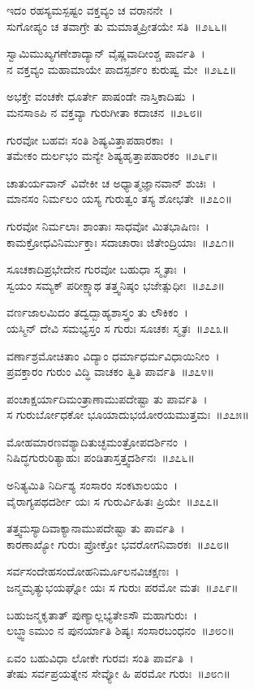 ಇದಂ ರಹಸ್ಯಮಸ್ಪಷ್ಟಂ ವಕ್ತವ್ಯಂ ಚ ವರಾನನೇ~।\\
ಸುಗೋಪ್ಯಂ ಚ ತವಾಗ್ರೇ ತು ಮಮಾತ್ಮಪ್ರೀತಯೇ ಸತಿ~॥೨೬೬॥

ಸ್ವಾಮಿಮುಖ್ಯಗಣೇಶಾದ್ಯಾನ್ ವೈಷ್ಣವಾದೀಂಶ್ಚ ಪಾರ್ವತಿ~।\\
ನ ವಕ್ತವ್ಯಂ ಮಹಾಮಾಯೇ ಪಾದಸ್ಪರ್ಶಂ ಕುರುಷ್ವ ಮೇ~॥೨೬೭॥

ಅಭಕ್ತೇ ವಂಚಕೇ ಧೂರ್ತೇ ಪಾಷಂಡೇ ನಾಸ್ತಿಕಾದಿಷು~।\\
ಮನಸಾಽಪಿ ನ ವಕ್ತವ್ಯಾ ಗುರುಗೀತಾ ಕದಾಚನ~॥೨೬೮॥

ಗುರವೋ ಬಹವಃ ಸಂತಿ ಶಿಷ್ಯವಿತ್ತಾಪಹಾರಕಾಃ~।\\
ತಮೇಕಂ ದುರ್ಲಭಂ ಮನ್ಯೇ ಶಿಷ್ಯಹೃತ್ತಾಪಹಾರಕಂ~॥೨೬೯॥

ಚಾತುರ್ಯವಾನ್ ವಿವೇಕೀ ಚ ಅಧ್ಯಾತ್ಮಜ್ಞಾನವಾನ್ ಶುಚಿಃ~।\\
ಮಾನಸಂ ನಿರ್ಮಲಂ ಯಸ್ಯ ಗುರುತ್ವಂ ತಸ್ಯ ಶೋಭತೇ~॥೨೭೦॥

ಗುರವೋ ನಿರ್ಮಲಾಃ ಶಾಂತಾಃ ಸಾಧವೋ ಮಿತಭಾಷಿಣಃ~।\\
ಕಾಮಕ್ರೋಧವಿನಿರ್ಮುಕ್ತಾಃ ಸದಾಚಾರಾಃ ಜಿತೇಂದ್ರಿಯಾಃ~॥೨೭೧॥

ಸೂಚಕಾದಿಪ್ರಭೇದೇನ ಗುರವೋ ಬಹುಧಾ ಸ್ಮೃತಾಃ~।\\
ಸ್ವಯಂ ಸಮ್ಯಕ್ ಪರೀಕ್ಷ್ಯಾಥ ತತ್ತ್ವನಿಷ್ಠಂ ಭಜೇತ್ಸುಧೀಃ~॥೨೭೨॥

ವರ್ಣಜಾಲಮಿದಂ ತದ್ವದ್ಬಾಹ್ಯಶಾಸ್ತ್ರಂ ತು ಲೌಕಿಕಂ~।\\
ಯಸ್ಮಿನ್ ದೇವಿ ಸಮಭ್ಯಸ್ತಂ ಸ ಗುರುಃ ಸೂಚಕಃ ಸ್ಮೃತಃ~॥೨೭೩॥

ವರ್ಣಾಶ್ರಮೋಚಿತಾಂ ವಿದ್ಯಾಂ ಧರ್ಮಾಧರ್ಮವಿಧಾಯಿನೀಂ~।\\
ಪ್ರವಕ್ತಾರಂ ಗುರುಂ ವಿದ್ಧಿ ವಾಚಕಂ ತ್ವಿತಿ ಪಾರ್ವತಿ~॥೨೭೪॥

ಪಂಚಾಕ್ಷರ್ಯಾದಿಮಂತ್ರಾಣಾಮುಪದೇಷ್ಟಾ ತು ಪಾರ್ವತಿ~।\\
ಸ ಗುರುರ್ಬೋಧಕೋ ಭೂಯಾದುಭಯೋರಯಮುತ್ತಮಃ~॥೨೭೫॥

ಮೋಹಮಾರಣವಶ್ಯಾದಿತುಚ್ಛಮಂತ್ರೋಪದರ್ಶಿನಂ~।\\
ನಿಷಿದ್ಧಗುರುರಿತ್ಯಾಹುಃ ಪಂಡಿತಾಸ್ತತ್ತ್ವದರ್ಶಿನಃ~॥೨೭೬॥

ಅನಿತ್ಯಮಿತಿ ನಿರ್ದಿಶ್ಯ ಸಂಸಾರಂ ಸಂಕಟಾಲಯಂ~।\\
ವೈರಾಗ್ಯಪಥದರ್ಶೀ ಯಃ ಸ ಗುರುರ್ವಿಹಿತಃ ಪ್ರಿಯೇ~॥೨೭೭॥

ತತ್ತ್ವಮಸ್ಯಾದಿವಾಕ್ಯಾನಾಮುಪದೇಷ್ಟಾ ತು ಪಾರ್ವತಿ~।\\
ಕಾರಣಾಖ್ಯೋ ಗುರುಃ ಪ್ರೋಕ್ತೋ ಭವರೋಗನಿವಾರಕಃ~॥೨೭೮॥

ಸರ್ವಸಂದೇಹಸಂದೋಹನಿರ್ಮೂಲನವಿಚಕ್ಷಣಃ~।\\
ಜನ್ಮಮೃತ್ಯುಭಯಘ್ನೋ ಯಃ ಸ ಗುರುಃ ಪರಮೋ ಮತಃ~॥೨೭೯॥

ಬಹುಜನ್ಮಕೃತಾತ್ ಪುಣ್ಯಾಲ್ಲಭ್ಯತೇಽಸೌ ಮಹಾಗುರುಃ~।\\
ಲಬ್ಧ್ವಾಽಮುಂ ನ ಪುನರ್ಯಾತಿ ಶಿಷ್ಯಃ ಸಂಸಾರಬಂಧನಂ~॥೨೮೦॥

ಏವಂ ಬಹುವಿಧಾ ಲೋಕೇ ಗುರವಃ ಸಂತಿ ಪಾರ್ವತಿ~।\\
ತೇಷು ಸರ್ವಪ್ರಯತ್ನೇನ ಸೇವ್ಯೋ ಹಿ ಪರಮೋ ಗುರುಃ~॥೨೮೧॥

